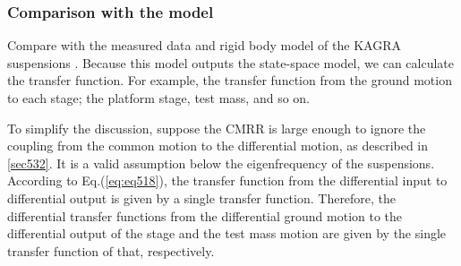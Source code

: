 \subsubsection{Comparison with the model}
Compare with the measured data and rigid body model of the KAGRA suspensions \cite{sekiguchi2016astudy}. Because this model outputs the state-space model, we can calculate the transfer function. For example, the transfer function from the ground motion to each stage; the platform stage, test mass, and so on.

To simplify the discussion, suppose the CMRR is large enough to ignore the coupling from the common motion to the differential motion, as described in \cref{sec532}. It is a valid assumption below the eigenfrequency of the suspensions. According to Eq.(\ref{eq:eq518}), the transfer function from the differential input to differential output is given by a single transfer function. Therefore, the differential transfer functions from the differential ground motion to the differential output of the stage and the test mass motion are given by the single transfer function of that, respectively.

